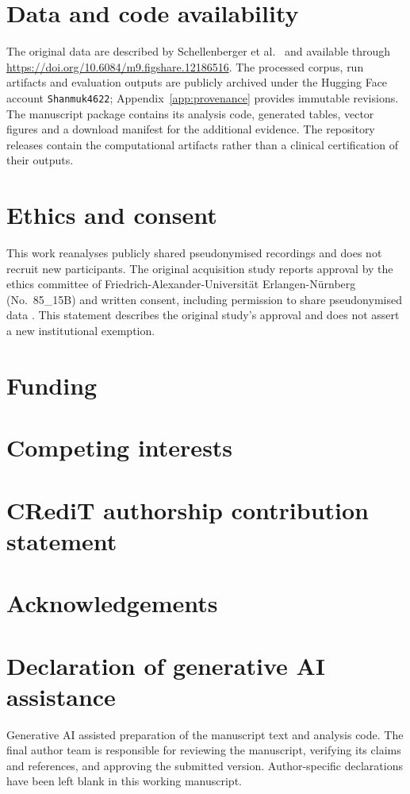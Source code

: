 \documentclass[11pt,a4paper]{article}
\newcommand{\blankfield}{\mbox{}\par\vspace{5mm}}
\begin{document}
\section*{Data and code availability}

The original data are described by Schellenberger et al.\ \citep{schellenberger2020} and
available through \url{https://doi.org/10.6084/m9.figshare.12186516}. The processed corpus,
run artifacts and evaluation outputs are publicly archived under the Hugging Face account
\texttt{Shanmuk4622}; Appendix~\ref{app:provenance} provides immutable revisions. The
manuscript package contains its analysis code, generated tables, vector figures and a
download manifest for the additional evidence. The repository releases contain the
computational artifacts rather than a clinical certification of their outputs.

\section*{Ethics and consent}

This work reanalyses publicly shared pseudonymised recordings and does not recruit new
participants. The original acquisition study reports approval by the ethics committee of
Friedrich-Alexander-Universit\"at Erlangen-N\"urnberg (No.~85\_15B) and written consent,
including permission to share pseudonymised data \citep{schellenberger2020}. This statement
describes the original study's approval and does not assert a new institutional exemption.

\section*{Funding}\blankfield
\section*{Competing interests}\blankfield
\section*{CRediT authorship contribution statement}\blankfield
\section*{Acknowledgements}\blankfield
\section*{Declaration of generative AI assistance}
Generative AI assisted preparation of the manuscript text and analysis code. The final
author team is responsible for reviewing the manuscript, verifying its claims and
references, and approving the submitted version. Author-specific declarations have been
left blank in this working manuscript.
\end{document}
